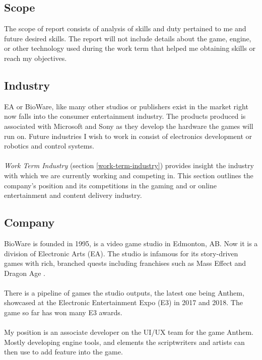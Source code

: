 \documentclass[10pt,letterpaper]{article}
\begin{document}
\subsection{Scope}\label{introduction-scope}

The scope of report consists of analysis of skills and duty pertained to me and future desired skills. The report will not include details about the game, engine, or other technology used during the work term that helped me obtaining skills or reach my objectives.

\subsection{Industry}\label{introduction-industry}

EA or BioWare, like many other studios or publishers exist in the market right now  falls into the consumer entertainment industry. The products produced is associated with Microsoft and Sony as they develop the hardware the games will run on. Future industries I wish to work in consist of electronics development or robotics and control systems.\\
\\
\textit{Work Term Industry} (section \ref{work-term-industry}) provides insight the industry with which we are currently working and competing in. This section outlines the company's position and its competitions in the gaming and or online entertainment and content delivery industry.

\subsection{Company}\label{introduction-company}

BioWare is founded in 1995, is a video game studio in Edmonton, AB. Now it is a division of Electronic Arts (EA). The studio is infamous for its story-driven games with rich, branched quests including franchises such as Mass Effect and Dragon Age \cite{bioware} \cite{bioware-wiki} \cite{bioware-wiki-list}.\\
\\
There is a pipeline of games the studio outputs, the latest one being Anthem, showcased at the Electronic Entertainment Expo (E3) in 2017 and 2018. The game so far has won many E3 awards.\\
\\
My position is an associate developer on the UI/UX team for the game Anthem. Mostly developing engine tools, and elements the scriptwriters and artists can then use to add feature into the game. \\
\end{document}
